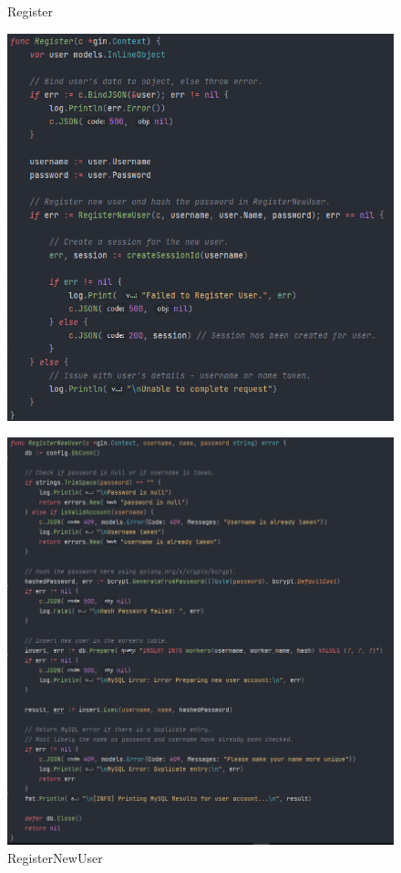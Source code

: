 \begin{figure}[H]
\begin{minipage}[b]{0.6\linewidth}
    \centering
    \caption{Register}
    \label{image:regFunc}
    \includegraphics[width=1.0\textwidth]{images/horton/account_system/register_func.png}
    \caption{RegisterNewUser}
    \label{image:regUserFunc}
    \includegraphics[width=1.0\textwidth]{images/horton/account_system/register_new_user.png}

\end{minipage}
\end{figure}
